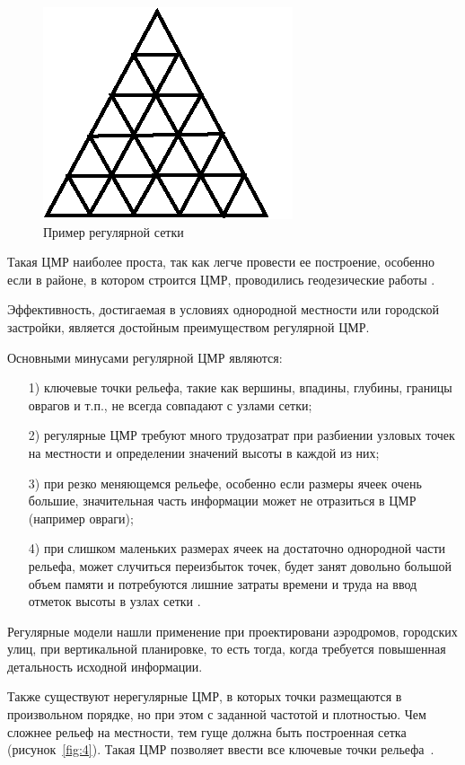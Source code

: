 \begin{figure}[h!]
    \center
    \includegraphics[scale=2]{images/regular.png}
    \caption{Пример регулярной сетки}
    \label{fig:3}
\end{figure}

Такая ЦМР наиболее проста, так как легче провести ее построение, особенно если в районе, в котором строится ЦМР, проводились геодезические работы \cite{9,20}. 

Эффективность, достигаемая в условиях однородной местности или городской застройки, является достойным преимуществом регулярной ЦМР.

Основными минусами регулярной ЦМР являются:  

\begin{enumerate} 
  \item[1)] ключевые точки рельефа, такие как вершины, впадины, глубины, границы оврагов и т.п., не всегда  совпадают с узлами сетки;
  \item[2)] регулярные ЦМР требуют много трудозатрат при разбиении узловых точек на местности и определении значений высоты в каждой из них;
  \item[3)] при резко меняющемся рельефе, особенно если размеры ячеек очень большие, значительная часть информации может не отразиться в ЦМР (например овраги);
  \item[4)] при слишком маленьких размерах ячеек на достаточно однородной части рельефа, может случиться переизбыток точек, будет занят довольно большой объем памяти и потребуются лишние затраты времени и труда на ввод отметок высоты в узлах сетки \cite{19,22}.
\end{enumerate} 

Регулярные модели нашли применение при проектировани аэродромов, городских улиц, при вертикальной планировке, то есть тогда, когда требуется повышенная детальность исходной информации. 

Также существуют нерегулярные ЦМР, в которых точки размещаются в произвольном порядке, но при этом с заданной частотой и плотностью. Чем сложнее рельеф на местности, тем гуще должна быть построенная сетка (рисунок~\ref{fig:4}). Такая ЦМР позволяет ввести все ключевые точки рельефа~\cite{10}.

